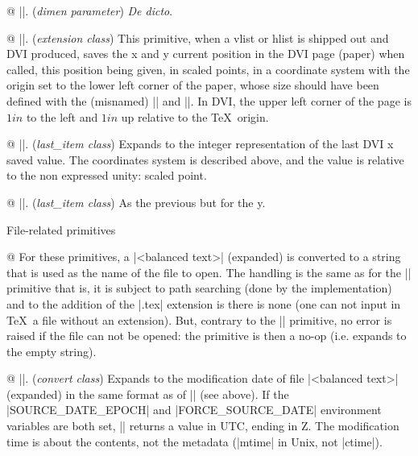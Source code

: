 @ |\pagewidth|. ({\sl dimen parameter})\enskip
{\it De dicto}.

@ |\savepos|. ({\sl extension class})\enskip
This primitive, when a vlist or hlist is shipped out and DVI produced,
saves the x and y current position in the DVI page (paper) when called,
this position being given, in scaled points, in a coordinate system
with the origin set to the lower left corner of the paper, whose
size should have been defined with the (misnamed) |\pagewidth| and
|\pageheight|. In DVI, the upper left corner of the page is $1in$
to the left and $1in$ up relative to the \TeX\ origin.


@ |\lastxpos|. ({\sl last\_item class})\enskip
Expands to the integer representation of the last DVI x saved value. The
coordinates system is described above, and the value is relative to the
non expressed unity: scaled point.

@ |\lastypos|. ({\sl last\_item class})\enskip
As the previous but for the y.

\enddiv %

\begindiv File-related primitives

@ For these primitives, a |<balanced text>| (expanded) is converted
to a string that is used as the name of the file to open. The
handling is the same as for the || primitive
that is, it is subject to path searching (done by the implementation)
and to the addition of the |.tex| extension is there is
none (one can not input in \TeX\ a file without an extension). But,
contrary to the || primitive, no error is raised if the file can
not be opened: the primitive is then a no-op (i.e. expands to the
empty string).
 
@ ||. ({\sl convert class})\enskip
Expands to the modification date of file |<balanced text>| (expanded)
in the same format as of |\creationdate| (see above).
If the |SOURCE_DATE_EPOCH| and |FORCE_SOURCE_DATE| environment
variables are both set, |\filemoddate| returns a value in UTC,
ending in Z. The modification time is about the contents, not the
metadata (|mtime| in Unix, not |ctime|).


